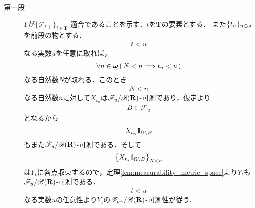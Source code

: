 	\begin{sketch}\mbox{}
		\begin{description}
			\item[第一段]
				$Y$が$\{\mathscr{F}_{t+}\}_{t \in \mathbf{T}}$-適合であることを示す．$t$を$\mathbf{T}$の要素とする．
				また$\{t_n\}_{n \in {\boldsymbol \omega}}$を前段の物とする．
				\begin{align}
					t < u
				\end{align}
				なる実数$u$を任意に取れば，
				\begin{align}
					\forall n \in {\boldsymbol \omega}\, (\, N < n \Longrightarrow t_n < u\, )
				\end{align}
				なる自然数$N$が取れる．このとき
				\begin{align}
					N < n
				\end{align}
				なる自然数$n$に対して$X_{t_n}$は$\mathscr{F}_u/\mathscr{B}(\mathbf{R})$-可測であり，仮定より
				\begin{align}
					B \in \mathscr{F}_u
				\end{align}
				となるから
				\begin{align}
					X_{t_n} \mbox{1}\hspace{-0.25em}\mbox{l}_{\Omega \backslash B}
				\end{align}
				もまた$\mathscr{F}_u/\mathscr{B}(\mathbf{R})$-可測である．そして
				\begin{align}
					\left\{X_{t_n} \mbox{1}\hspace{-0.25em}\mbox{l}_{\Omega \backslash B}\right\}_{N < n}
				\end{align}
				は$Y_t$に各点収束するので，定理\ref{lem:measurability_metric_space}より$Y_t$も$\mathscr{F}_u/\mathscr{B}(\mathbf{R})$-可測である．
				\begin{align}
					t < u
				\end{align}
				なる実数$u$の任意性より$Y_t$の$\mathscr{F}_{t+}/\mathscr{B}(\mathbf{R})$-可測性が従う．
			

\end{description}
\end{sketch}
